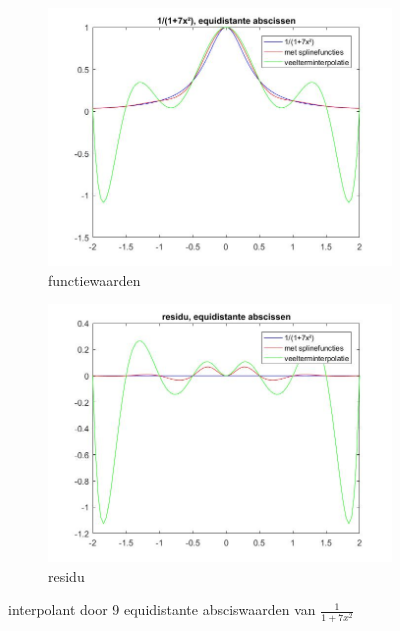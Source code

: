 \begin{figure}
\centering
\begin{subfigure}{.5\textwidth}
  \centering
  \includegraphics[width=\linewidth]{afbeeldingen/rat_equi.jpg}
  \caption{functiewaarden}
\end{subfigure}%
\begin{subfigure}{.5\textwidth}
  \centering
  \includegraphics[width=\linewidth]{afbeeldingen/rat_equi_res.jpg}
  \caption{residu}
\end{subfigure}
\caption{interpolant door 9 equidistante absciswaarden van $\frac{1}{1+7x^2}$}
\label{fig:ratequi}
\end{figure}